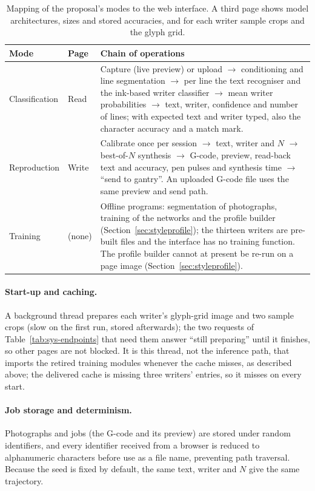 \begin{table}[!htbp]
\centering
\fontsize{9.5}{11.5}\selectfont
\begin{tabularx}{\linewidth}{|p{2.1cm}|p{2.1cm}|X|}
\hline
\textbf{Mode} & \textbf{Page} & \textbf{Chain of operations} \\
\hline
Classification & Read & Capture (live preview) or upload $\rightarrow$ conditioning and line segmentation $\rightarrow$ per line the text recogniser and the ink-based writer classifier $\rightarrow$ mean writer probabilities $\rightarrow$ text, writer, confidence and number of lines; with expected text and writer typed, also the character accuracy and a match mark. \\
\hline
Reproduction & Write & Calibrate once per session $\rightarrow$ text, writer and $N$ $\rightarrow$ best-of-$N$ synthesis $\rightarrow$ G-code, preview, read-back text and accuracy, pen pulses and synthesis time $\rightarrow$ ``send to gantry''. An uploaded G-code file uses the same preview and send path. \\
\hline
Training & (none) & Offline programs: segmentation of photographs, training of the networks and the profile builder (Section~\ref{sec:styleprofile}); the thirteen writers are pre-built files and the interface has no training function. The profile builder cannot at present be re-run on a page image (Section~\ref{sec:styleprofile}). \\
\hline
\end{tabularx}
\caption{Mapping of the proposal's modes to the web interface. A third page shows model architectures, sizes and stored accuracies, and for each writer sample crops and the glyph grid.}
\label{tab:sys-modes}
\end{table}

\paragraph{Start-up and caching.}
A background thread prepares each writer's glyph-grid image and two sample crops (slow on the first run, stored afterwards); the two requests of Table~\ref{tab:sys-endpoints} that need them answer ``still preparing'' until it finishes, so other pages are not blocked.
It is this thread, not the inference path, that imports the retired training modules whenever the cache misses, as described above; the delivered cache is missing three writers' entries, so it misses on every start.

\paragraph{Job storage and determinism.}
Photographs and jobs (the G-code and its preview) are stored under random identifiers, and every identifier received from a browser is reduced to alphanumeric characters before use as a file name, preventing path traversal.
Because the seed is fixed by default, the same text, writer and $N$ give the same trajectory.

